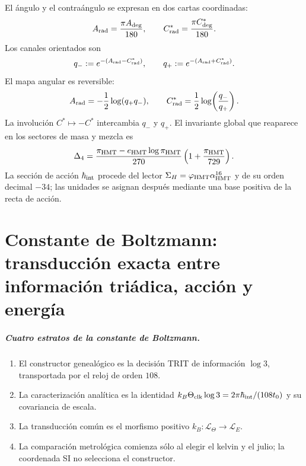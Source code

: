 El ángulo y el contraángulo se expresan en dos cartas coordinadas:
\[
 A_{\rm rad}=\frac{\pi A_{\rm deg}}{180},
 \qquad
 C^*_{\rm rad}=\frac{\pi C^*_{\rm deg}}{180}.
\]
Los canales orientados son
\begin{equation}
 \label{eq:amp18-constantes-qpm}
 q_-:=e^{-(A_{\rm rad}-C^*_{\rm rad})},
 \qquad
 q_+:=e^{-(A_{\rm rad}+C^*_{\rm rad})}.
\end{equation}
El mapa angular es reversible:
\begin{equation}
 \label{eq:amp18-constantes-qpm-inversa}
 A_{\rm rad}=-\frac12\log(q_+q_-),\qquad
 C^*_{\rm rad}=\frac12\log\!\left(\frac{q_-}{q_+}\right).
\end{equation}
La involución \(C^*\mapsto-C^*\) intercambia \(q_-\) y \(q_+\). El
invariante global que reaparece en los sectores de masa y mezcla es
\begin{equation}
 \label{eq:amp18-constantes-delta4}
 \Delta_4=\frac{\pi_{\rm HMT}-e_{\rm HMT}\log\pi_{\rm HMT}}{270}
 \left(1+\frac{\pi_{\rm HMT}}{729}\right).
\end{equation}
La sección de acción \(\hbar_{\rm int}\) procede del lector
\(\Sigma_H=\varphi_{\rm HMT}\alpha_{\rm HMT}^{16}\) y de su orden decimal
\(-34\); las unidades se asignan después mediante una base positiva de la
recta de acción.

\chapter[Constante de Boltzmann y transducción térmica]{Constante de
Boltzmann: transducción exacta entre información triádica, acción y energía}

\paragraph{Cuatro estratos de la constante de Boltzmann.}
\begin{enumerate}
 \item El constructor genealógico es la decisión TRIT de información
 \(\log3\), transportada por el reloj de orden \(108\).
 \item La caracterización analítica es la identidad
 \(k_B\Theta_{\rm clk}\log3
 =2\pi\hbar_{\rm int}/(108t_0)\) y su covariancia de escala.
 \item La transducción común es el morfismo positivo
 \(k_B:\mathcal L_\Theta\to\mathcal L_E\).
 \item La comparación metrológica comienza sólo al elegir el kelvin y el
 julio; la coordenada SI no selecciona el constructor.
\end{enumerate}

